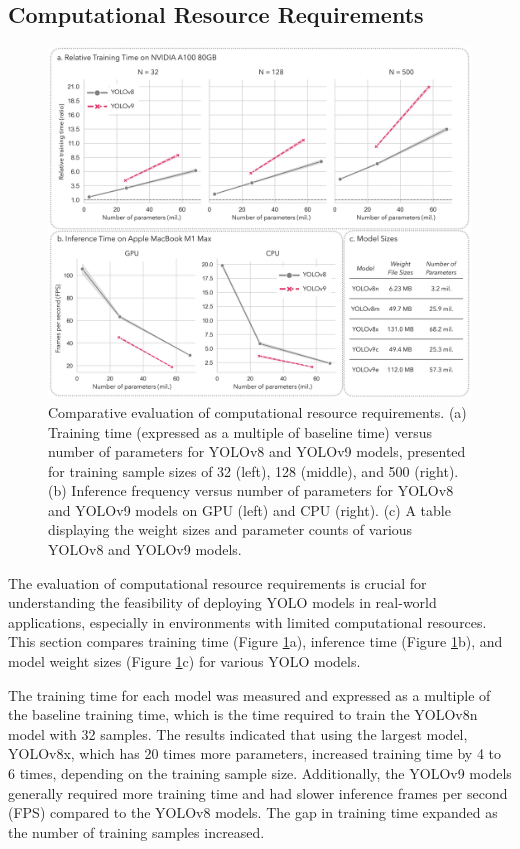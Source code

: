 \subsection*{Computational Resource Requirements}

\begin{figure}[h]
    \centering
    \includegraphics[width=1\textwidth]{figure_6.jpg}
    \caption{Comparative evaluation of computational resource requirements. (a) Training time (expressed as a multiple of baseline time) versus number of parameters for YOLOv8 and YOLOv9 models, presented for training sample sizes of 32 (left), 128 (middle), and 500 (right). (b) Inference frequency versus number of parameters for YOLOv8 and YOLOv9 models on GPU (left) and CPU (right). (c) A table displaying the weight sizes and parameter counts of various YOLOv8 and YOLOv9 models.}
    \label{fig:resources}
\end{figure}

The evaluation of computational resource requirements is crucial for understanding the feasibility of deploying YOLO models in real-world applications, especially in environments with limited computational resources. This section compares training time (Figure \ref{fig:resources}a), inference time (Figure \ref{fig:resources}b), and model weight sizes (Figure \ref{fig:resources}c) for various YOLO models.

The training time for each model was measured and expressed as a multiple of the baseline training time, which is the time required to train the YOLOv8n model with 32 samples. The results indicated that using the largest model, YOLOv8x, which has 20 times more parameters, increased training time by 4 to 6 times, depending on the training sample size. Additionally, the YOLOv9 models generally required more training time and had slower inference frames per second (FPS) compared to the YOLOv8 models. The gap in training time expanded as the number of training samples increased.

